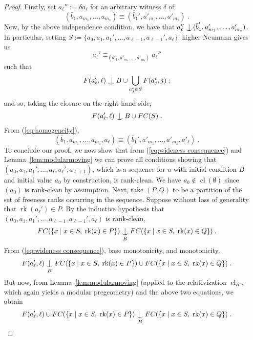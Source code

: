 \documentclass{article}
\theoremstyle{remark}
\theoremstyle{definition}
\DeclareMathOperator{\rk}{rk}
\DeclareMathOperator{\cl}{cl}
\def\Ind#1#2{#1\setbox0=\hbox{$#1x$}\kern\wd0\hbox to 0pt{\hss$#1\mid$\hss}
	\lower.9\ht0\hbox to 0pt{\hss$#1\smile$\hss}\kern\wd0}
\def\ind{\mathop{\mathpalette\Ind{}}}
\begin{document}
{\begin{proof}
Firstly, set $a_\ell'':=\delta a_\ell$ for an arbitrary witness $\delta$ of \begin{equation}\label{eq:extend2}
(\bar{b}_1,a_{m_1},\dots, a_{m_s}) 
 \equiv (\bar{b}_1',a'_{m_1},\dots, a'_{m_s}) 
 \;.  
\end{equation}
Now, by the above independence condition, we have that $a_\ell''\ind (\overline{b}'_1, a'_{m_1},\dots, a'_{m_s})$. In particular, {setting $S:=\{a_0,a_1,a_1', \dots,a_{\ell-1}, a_{\ell-1}', a_\ell\}$},  higher Neumann gives us 
\begin{equation}\label{eq:homogeneity}
    a_\ell'\equiv_{(\overline{b}'_1, a'_{m_1},\dots, a'_{m_s})} a_\ell''
\end{equation}
such that
\[ {F(a_\ell', \ell)\ind B\cup \bigcup_{a_j^\epsilon\in {S}}F(a_j^\epsilon, j)\;;}\]
{and so, taking the %
{closure} on the right-hand side,}
\begin{equation}\label{eq:wideness consequence}
    F(a_\ell', \ell)\ind B\cup FC({S})\;.
\end{equation}
From (\ref{eq:homogeneity}), 
\[(\bar{b}_1,a_{m_1},\dots, a_{m_s}, a_\ell)\equiv (\bar{b}_1',a'_{m_1},\dots, a'_{m_s}, a'_\ell)\;.\]
{To conclude our proof, we now show that from (\ref{eq:wideness consequence}) and Lemma~\ref{lem:modularmoving} we can prove all conditions showing that $(a_0,a_1,a_1', \dots,a_\ell,a_\ell', a_{\ell+1})$, which is a sequence for $u$ with initial condition $B$ and initial value $a_0$ by construction, is rank-clean. We have $a_0\notin{\cl}(\emptyset)$ since $(a_0)$ is rank-clean by assumption. Next, take $(P, Q)$ to be a partition of the set of freeness ranks occurring in %
the sequence. Suppose without loss of generality that $\rk(a_\ell')\in P$.  By the inductive hypothesis that $(a_0,a_1,a_1', \dots,a_{\ell-1},a_{\ell-1}', a_\ell)$ is rank-clean,}
\[FC(\{x\;\vert\; x\in S,\; \rk(x)\in P\})\ind_B FC(\{x\;\vert\; x\in S,\; \rk(x)\in Q\})\;.\]
From (\ref{eq:wideness consequence}),  base monotonicity, and monotonicity,
\[ F(a_\ell', \ell)\ind_B FC(\{x\;\vert\; x\in S,\; \rk(x)\in P\})\cup FC(\{x\;\vert\; x\in S,\; \rk(x)\in Q\})\;.\]
But now, from Lemma~\ref{lem:modularmoving} {(applied to the relativization ${\cl}_B$, which again yields a modular pregeometry)} and the above two equations, we obtain 
\[ F(a_\ell', \ell)\cup FC(\{x\;\vert\; x\in S,\; \rk(x)\in P\})\ind_B  FC(\{x\;\vert\; x\in S,\; \rk(x)\in Q\})\;.\]

\end{proof}}
\end{document}
